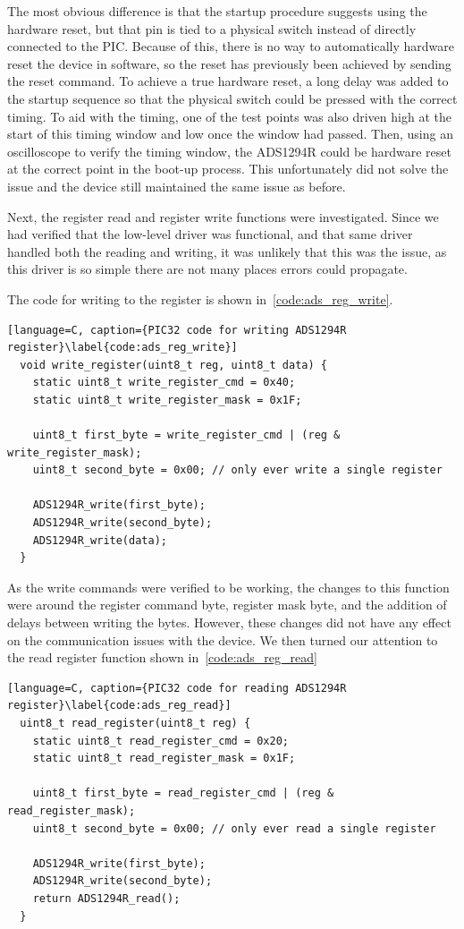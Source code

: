 The most obvious difference is that the startup procedure suggests using the hardware reset,
but that pin is tied to a physical switch instead of directly connected to the PIC.
Because of this, there is no way to automatically hardware reset the device in software,
so the reset has previously been achieved by sending the reset command.
To achieve a true hardware reset, a long delay was added to the startup sequence so that the physical switch could be pressed with the correct timing.
To aid with the timing, one of the test points was also driven high at the start of this timing window and low once the window had passed.
Then, using an oscilloscope to verify the timing window, the ADS1294R could be hardware reset at the correct point in the boot-up process.
This unfortunately did not solve the issue and the device still maintained the same issue as before.

Next, the register read and register write functions were investigated.
Since we had verified that the low-level driver was functional, and that same driver handled both the reading and writing,
it was unlikely that this was the issue, as this driver is so simple there are not many places errors could propagate.

The code for writing to the register is shown in~\autoref{code:ads_reg_write}.

\begin{lstlisting}[language=C, caption={PIC32 code for writing ADS1294R register}\label{code:ads_reg_write}]
  void write_register(uint8_t reg, uint8_t data) {
    static uint8_t write_register_cmd = 0x40;
    static uint8_t write_register_mask = 0x1F;

    uint8_t first_byte = write_register_cmd | (reg & write_register_mask);
    uint8_t second_byte = 0x00; // only ever write a single register

    ADS1294R_write(first_byte);
    ADS1294R_write(second_byte);
    ADS1294R_write(data);
  }
\end{lstlisting}

As the write commands were verified to be working, the changes to this function were around the register command byte,
register mask byte, and the addition of delays between writing the bytes.
However, these changes did not have any effect on the communication issues with the device.
We then turned our attention to the read register function shown in~\autoref{code:ads_reg_read}

\begin{lstlisting}[language=C, caption={PIC32 code for reading ADS1294R register}\label{code:ads_reg_read}]
  uint8_t read_register(uint8_t reg) {
    static uint8_t read_register_cmd = 0x20;
    static uint8_t read_register_mask = 0x1F;

    uint8_t first_byte = read_register_cmd | (reg & read_register_mask);
    uint8_t second_byte = 0x00; // only ever read a single register

    ADS1294R_write(first_byte);
    ADS1294R_write(second_byte);
    return ADS1294R_read();
  }
\end{lstlisting}

